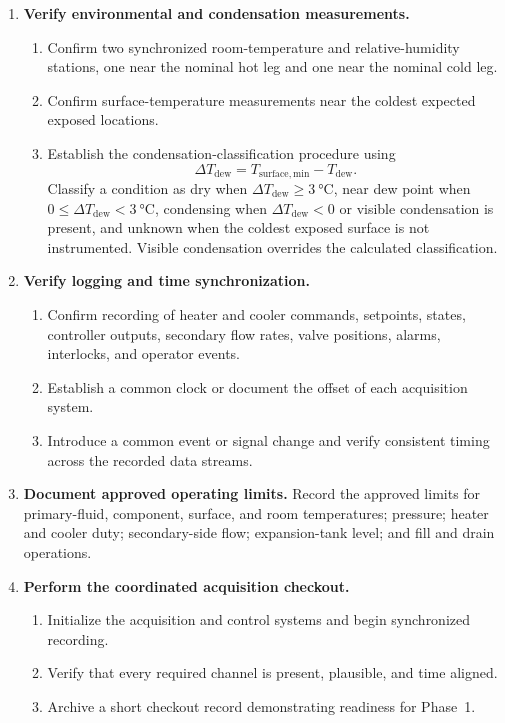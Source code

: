 \documentclass[11pt]{article}
\begin{document}
\begin{enumerate}
    \item \textbf{Verify environmental and condensation measurements.}
    \begin{enumerate}
        \item Confirm two synchronized room-temperature and relative-humidity stations, one near the nominal hot leg and one near the nominal cold leg.
        \item Confirm surface-temperature measurements near the coldest expected exposed locations.
        \item Establish the condensation-classification procedure using
        \begin{equation}
            \Delta T_{\mathrm{dew}}
            =
            T_{\mathrm{surface,min}}-T_{\mathrm{dew}}.
        \end{equation}
        Classify a condition as dry when $\Delta T_{\mathrm{dew}}\geq\SI{3}{\degreeCelsius}$, near dew point when $0\leq\Delta T_{\mathrm{dew}}<\SI{3}{\degreeCelsius}$, condensing when $\Delta T_{\mathrm{dew}}<0$ or visible condensation is present, and unknown when the coldest exposed surface is not instrumented. Visible condensation overrides the calculated classification.
    \end{enumerate}

    \item \textbf{Verify logging and time synchronization.}
    \begin{enumerate}
        \item Confirm recording of heater and cooler commands, setpoints, states, controller outputs, secondary flow rates, valve positions, alarms, interlocks, and operator events.
        \item Establish a common clock or document the offset of each acquisition system.
        \item Introduce a common event or signal change and verify consistent timing across the recorded data streams.
    \end{enumerate}

    \item \textbf{Document approved operating limits.}
    Record the approved limits for primary-fluid, component, surface, and room temperatures; pressure; heater and cooler duty; secondary-side flow; expansion-tank level; and fill and drain operations.

    \item \textbf{Perform the coordinated acquisition checkout.}
    \begin{enumerate}
        \item Initialize the acquisition and control systems and begin synchronized recording.
        \item Verify that every required channel is present, plausible, and time aligned.
        \item Archive a short checkout record demonstrating readiness for Phase~1.
    \end{enumerate}
\end{enumerate}
\end{document}
